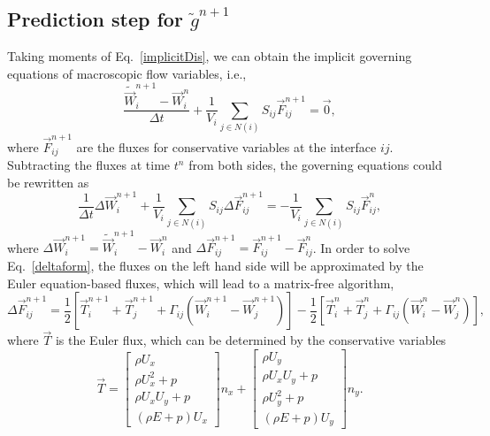 \documentclass[3p,12pt]{elsarticle}
\begin{document}
	\subsection{Prediction step for $\tilde{g}^{n+1}$}
	Taking moments of Eq.~\eqref{implicitDis}, we can obtain the implicit governing equations of macroscopic flow variables, i.e.,
	\begin{equation}
		\frac{\tilde{\vec{W}}_{i}^{n+1} - \vec{W}_i^n}{\Delta t} + \frac{1}{V_i}\sum_{j\in N(i)}S_{ij}\vec{F}_{ij}^{n+1} = \vec{0},
	\end{equation}
	where $\vec{F}_{ij}^{n+1}$ are the fluxes for conservative variables at  the interface $ij$. Subtracting the fluxes at time $t^{n}$ from both sides, the governing equations could be rewritten as
	\begin{equation}
		\frac{1}{\Delta t}\Delta \vec{W}_{i}^{n+1}  + \frac{1}{V_i}\sum_{j\in N(i)}S_{ij}\Delta\vec{F}_{ij}^{n+1} = -\frac{1}{V_i}\sum_{j\in N(i)}S_{ij}\vec{F}_{ij}^{n},
		\label{deltaform}\end{equation}
	where $\Delta \vec{W}_{i}^{n+1} = \tilde{\vec{W}}_{i}^{n+1} - \vec{W}_i^n$ and $\Delta \vec{F}_{ij}^{n+1} = \vec{F}_{ij}^{n+1} - \vec{F}_{ij}^{n}$.
	In order to solve Eq.~\eqref{deltaform}, the fluxes on the left hand side will be approximated by the Euler equation-based fluxes, which will lead to a matrix-free algorithm,
	\begin{equation}
		\Delta \vec{F}_{ij}^{n+1} = \frac{1}{2} \left[ \vec{T}_i^{n+1} +  \vec{T}_j^{n+1} + \Gamma_{ij} \left( \vec{W}_i^{n+1} - \vec{W}_j^{n+1}\right)\right] - \frac{1}{2} \left[ \vec{T}_i^{n} +  \vec{T}_j^{n} + \Gamma_{ij} \left( \vec{W}_i^{n} - \vec{W}_j^{n}\right)\right],
	\end{equation}
	where $\vec{T}$ is the Euler flux, which can be determined by the conservative variables
	\begin{equation}
		\vec{T} =\left[\begin{array}{c}\rho U_x  \\ \rho U_{x}^2+ p \\ \rho U_{x} U_{y}+p\\ (\rho E + p) U_x \end{array}\right] n_x + \left[\begin{array}{c}\rho U_y  \\ \rho U_{x}U_{y}+ p \\ \rho U_{y}^2+p\\ (\rho E + p) U_y \end{array}\right]n_y.
	\end{equation}
\end{document}
